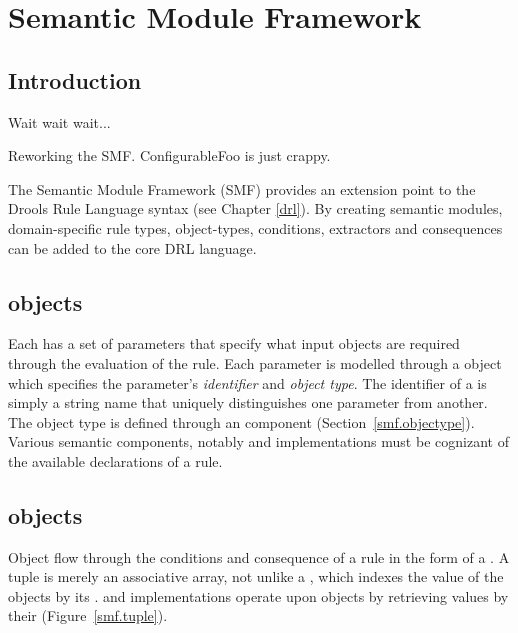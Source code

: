 \chapter{Semantic Module Framework}
\label{smf}

\section{Introduction}

\begin{implnote}
Wait wait wait...

Reworking the SMF.  ConfigurableFoo is just crappy.
\end{implnote}

The Semantic Module Framework (SMF)
provides an extension point to the Drools Rule Language syntax
(see Chapter \vref{drl}).  By creating semantic modules,
domain-specific rule types, object-types, conditions, extractors and consequences
can be added to the core DRL language.

\section{ objects}
\label{smf.declaration}

Each  has a set of parameters that specify what input objects
are required through the evaluation of the rule.  Each parameter is
modelled through a  object which specifies the
parameter's \emph{identifier} and \emph{object type}.  The
identifier of a  is simply a string name that
uniquely distinguishes one parameter from another.  The object type
is defined through an  component
(Section~\vref{smf.objectype}).  Various semantic components, notably
 and  implementations
must be cognizant of the available declarations of a rule.

\section{ objects}

Object flow through the conditions and consequence of a rule in the
form of a .  A tuple is merely an associative
array, not unlike a , which indexes the value of
the objects by its .   and
 implementations operate upon  objects
by retrieving values by their 
(Figure~\vref{smf.tuple}).

